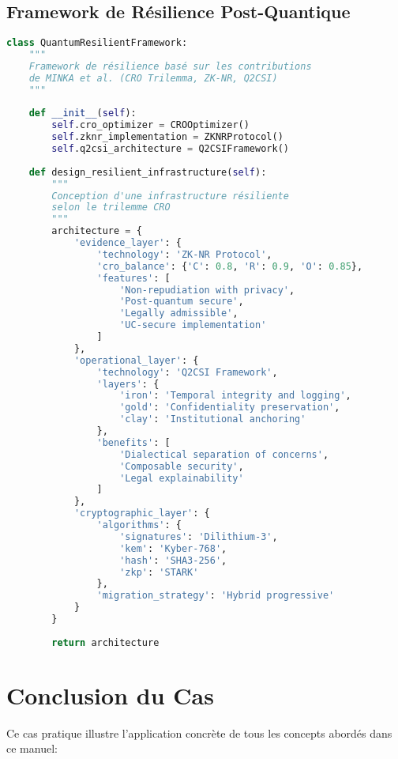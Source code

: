 \subsection{Framework de Résilience Post-Quantique}
\begin{lstlisting}[language=Python, caption=Framework de résilience basé sur les contributions de MINKA et al.]
class QuantumResilientFramework:
    """
    Framework de résilience basé sur les contributions
    de MINKA et al. (CRO Trilemma, ZK-NR, Q2CSI)
    """
    
    def __init__(self):
        self.cro_optimizer = CROOptimizer()
        self.zknr_implementation = ZKNRProtocol()
        self.q2csi_architecture = Q2CSIFramework()
    
    def design_resilient_infrastructure(self):
        """
        Conception d'une infrastructure résiliente
        selon le trilemme CRO
        """
        architecture = {
            'evidence_layer': {
                'technology': 'ZK-NR Protocol',
                'cro_balance': {'C': 0.8, 'R': 0.9, 'O': 0.85},
                'features': [
                    'Non-repudiation with privacy',
                    'Post-quantum secure',
                    'Legally admissible',
                    'UC-secure implementation'
                ]
            },
            'operational_layer': {
                'technology': 'Q2CSI Framework',
                'layers': {
                    'iron': 'Temporal integrity and logging',
                    'gold': 'Confidentiality preservation',
                    'clay': 'Institutional anchoring'
                },
                'benefits': [
                    'Dialectical separation of concerns',
                    'Composable security',
                    'Legal explainability'
                ]
            },
            'cryptographic_layer': {
                'algorithms': {
                    'signatures': 'Dilithium-3',
                    'kem': 'Kyber-768',
                    'hash': 'SHA3-256',
                    'zkp': 'STARK'
                },
                'migration_strategy': 'Hybrid progressive'
            }
        }
        
        return architecture
\end{lstlisting}

\section{Conclusion du Cas}
Ce cas pratique illustre l'application concrète de tous les concepts abordés dans ce manuel:

